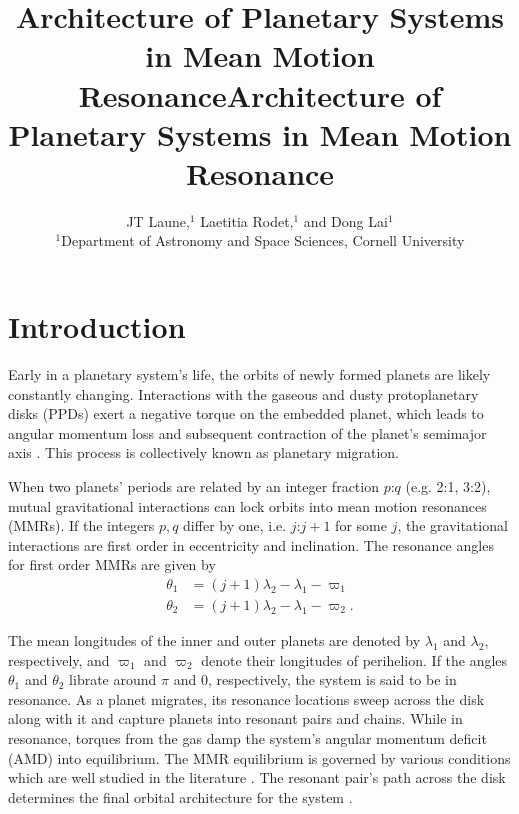 \documentclass{mnras}
\title[MMR Architecture]{Architecture of Planetary Systems in Mean Motion Resonance}
\author[Laune et al.]{
JT Laune,$^{1}$
Laetitia Rodet,$^{1}$
and Dong Lai$^{1}$
\\
$^{1}$Department of Astronomy and Space Sciences, Cornell University\\}
\date{}
\title{Architecture of Planetary Systems in Mean Motion Resonance}
\begin{document}
\maketitle
\maketitle

\section{Introduction}
\label{sec:orgd3d05be}

Early in a planetary system’s life, the orbits of newly formed planets
are likely constantly changing.  Interactions with the gaseous and
dusty protoplanetary disks (PPDs) exert a negative torque on the
embedded planet, which leads to angular momentum loss and subsequent
contraction of the planet’s semimajor axis
\cite{nelson_planetary_2018}. This process is collectively known as
planetary migration.

When two planets' periods are related by an integer fraction \(p\):\(q\)
(e.g. 2:1, 3:2), mutual gravitational interactions can lock orbits
into mean motion resonances (MMRs).
If the integers \(p,q\) differ by one, i.e. \(j\):\(j+1\) for some \(j\),
the gravitational interactions are first order in eccentricity
and inclination.
The resonance angles for first order MMRs are given by
\begin{align}
\label{circangles}
 \theta_1 &= (j+1)\lambda_2 - \lambda_1 - \varpi_1 \\
 \theta_2 &= (j+1)\lambda_2 - \lambda_1 - \varpi_2.
\end{align}

The mean longitudes of the inner and outer planets are denoted by
\(\lambda_1\) and \(\lambda_2\), respectively, and \(\varpi_1\) and
\(\varpi_2\) denote their longitudes of perihelion.  If the angles
\(\theta_1\) and \(\theta_2\) librate around \(\pi\) and \(0\), respectively,
the system is said to be in resonance.  As a planet migrates, its
resonance locations sweep across the disk along with it and capture
planets into resonant pairs and chains.
While in resonance, torques from the gas damp the
system's angular momentum deficit (AMD) into equilibrium.  The MMR
equilibrium is governed by various conditions which are well studied
in the literature
\cite{henrard_second_1983,deck_migration_2015,goldreich_overstable_2014,xu_migration_2018,henrard_second_1983}.
The resonant pair's path across the disk determines the final orbital
architecture for the system
\cite{cresswell_evolution_2006,cresswell_three-dimensional_2008}.
\end{document}
